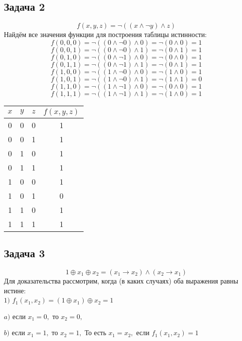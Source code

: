 \documentclass[a4paper,14pt]{article} %
\begin{document}
\begin{center}
\subsection{Задача 2}
\end{center}
\[f(x,y,z)=\neg{((x \wedge \neg y)\wedge z)}\]
Найдём все значения функции для построения таблицы истинности:
\[f(0,0,0)=\neg{((0 \wedge \neg 0)\wedge 0)}=\neg{(0\wedge 0)}=1\]
\[f(0,0,1)=\neg{((0 \wedge \neg 0)\wedge 1)}=\neg{(0\wedge 1)}=1\]
\[f(0,1,0)=\neg{((0 \wedge \neg 1)\wedge 0)}=\neg{(0\wedge 0)}=1\]
\[f(0,1,1)=\neg{((0 \wedge \neg 1)\wedge 1)}=\neg{(0\wedge 1)}=1\]
\[f(1,0,0)=\neg{((1 \wedge \neg 0)\wedge 0)}=\neg{(1\wedge 0)}=1\]
\[f(1,0,1)=\neg{((1 \wedge \neg 0)\wedge 1)}=\neg{(1\wedge 1)}=0\]
\[f(1,1,0)=\neg{((1 \wedge \neg 1)\wedge 0)}=\neg{(0\wedge 0)}=1\]
\[f(1,1,1)=\neg{((1 \wedge \neg 1)\wedge 1)}=\neg{(1\wedge 0)}=1\]
\begin{center}
\begin{tabular}{|c|c|c|c|}
\hline
$x$ & $y$ & $z$ & $f(x,y,z)$ \\
\hline
0 & 0 & 0 & 1 \\
\hline
0 & 0 & 1 & 1 \\
\hline
0 & 1 & 0 & 1 \\
\hline
0 & 1 & 1 & 1 \\
\hline
1 & 0 & 0 & 1 \\
\hline
1 & 0 & 1 & 0 \\
\hline
1 & 1 & 0 & 1 \\
\hline
1 & 1 & 1 & 1 \\
\hline
\end{tabular}
\end{center}

\newpage
\begin{center}
\subsection{Задача 3}
\end{center}
\[1\oplus x_1 \oplus x_2 = (x_1\rightarrow x_2) \wedge (x_2\rightarrow x_1) \]
Для доказательства рассмотрим, когда (в каких случаях) оба выражения равны истине:\\

$1)$ $f_1(x_1, x_2)= (1\oplus x_1) \oplus x_2 =1$

$ a)$ если $x_1=0,$ то $x_2=0,$

$ b)$ если $x_1=1,$ то $x_2=1,$
То есть $x_1 = x_2,$ если $f_1(x_1, x_2)=1$ \\
\end{document}
